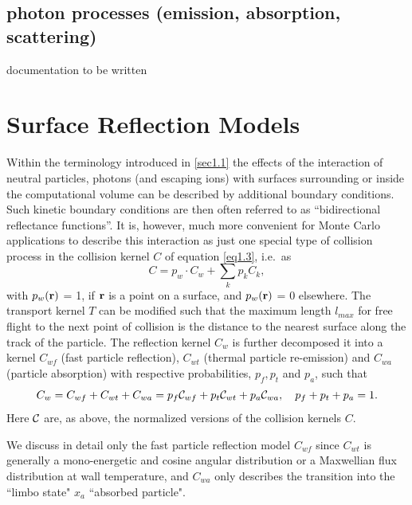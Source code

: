 \subsection{photon processes (emission, absorption, scattering)}

documentation to be written 

\newpage 

\section{Surface Reflection Models} \label{sec1.3} 

Within the terminology introduced in \cref{sec1.1} the effects of the
interaction of neutral particles, photons (and escaping ions) with surfaces
surrounding or inside the computational volume can be described by additional
boundary conditions.
Such kinetic boundary conditions are then often referred to as ``bidirectional
reflectance functions''.
It is, however, much more convenient for Monte Carlo applications to describe
this interaction as just one special type of collision process in the collision
kernel $C$ of equation \cref{eq1.3}, i.e.\ as
\begin{equation}
  \label{eq1.14} C
  = p_w	 \cdot	 C_w	+ \sum_{k}  p_k   C_k,
\end{equation}
with $ p_w (\mathbf{r}
  )$ = 1, if $ \mathbf{r} $ is a point on a surface, and $ p_w (\mathbf{r})$ = 0 elsewhere.
The transport kernel $T$ can be modified such that the maximum length $
  l_{max}$ for free flight to the next point of collision is the distance to the
nearest surface along the track of the particle.
The reflection kernel $ C_w$ is further decomposed it into a kernel $ C_{wf}$
(fast particle reflection), $ C_{wt}$ (thermal particle re-emission) and $
  C_{wa}$ (particle absorption) with respective probabilities, $ p_f, p_t$  and $
  p_ a$, such that
\begin{equation}
  C_w = C_{wf}	+   C_{wt}   +	 C_{wa} = p_f
  {\cal{C}}_{wf}	 + p_t	{\cal{C}}_{wt}	+   p_a {\cal{C}}_{wa}, \quad p_f + p_t
  + p_a = 1 .
  \label{eq1.15}
\end{equation}
Here ${\cal{C}}$ are, as above, the normalized versions of the collision
kernels $C$.

We discuss in detail only the fast particle reflection model $ C_{wf}$ since
$C_{wt}$ is generally a mono-energetic and cosine angular distribution or a
Maxwellian flux distribution at wall temperature, and $C_{wa}$ only describes
the transition into the ``limbo state" $ x_a$ ``absorbed particle".

